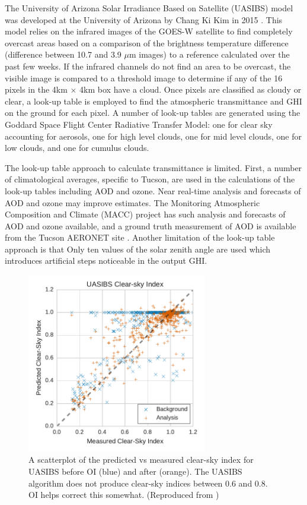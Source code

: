 The University of Arizona Solar Irradiance Based on Satellite (UASIBS)
model was developed at the University of Arizona by Chang Ki Kim in
2015 \citep{Kim2016}.
This model relies on the infrared images of the GOES-W satellite to
find completely overcast areas based on a comparison of the brightness
temperature difference (difference between 10.7 and 3.9 $\mu$m
images) to a reference calculated over the past few weeks.
If the infrared channels do not find an area to be overcast, the
visible image is compared to a threshold image to determine if any of
the 16 pixels in the 4km $\times$ 4km box have a cloud.
Once pixels are classified as cloudy or clear, a look-up table is
employed to find the atmospheric transmittance and GHI on the ground
for each pixel.
A number of look-up tables are generated using the Goddard Space
Flight Center Radiative Transfer Model: one for clear sky
accounting for aerosols, one for high level clouds, one for mid level
clouds, one for low clouds, and one for cumulus clouds.

The look-up table approach to calculate transmittance is limited.
First, a number of climatological averages, specific to Tucson, are
used in the calculations of the look-up tables including AOD and
ozone.
Near real-time analysis and forecasts of AOD and ozone may improve
estimates.
The Monitoring Atmospheric Composition and Climate (MACC) project
\citep{Morcrette2009} has such analysis and forecasts of AOD and ozone
available, and a ground truth measurement of AOD is available from the
Tucson AERONET site \citep{Holben1998}.
Another limitation of the look-up table approach is that Only ten
values of the solar zenith angle are used which introduces artificial
steps noticeable in the output GHI.

\begin{figure}[h]
\centering
\includegraphics[width=0.7\textwidth]{figs/uasibs_scatter.pdf}
\caption[Scatterplot of predicted vs measured clear-sky index for
UASIBS]{A scatterplot of the predicted vs measured clear-sky index for
UASIBS before OI (blue) and after (orange). The UASIBS algorithm does
not produce clear-sky indices between 0.6 and 0.8. OI helps correct
this somewhat. (Reproduced from \cite{Lorenzo2017})}
\label{fig:uasibs_scatter}
\end{figure}

